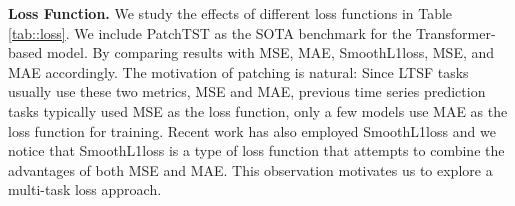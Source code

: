 \documentclass{article} \usepackage{iclr2024_conference,times}
\begin{document}
\textbf{Loss Function.} We study the effects of different loss functions in Table \ref{tab::loss}. We include PatchTST as the SOTA benchmark for the Transformer-based model. By comparing results with MSE, MAE, SmoothL1loss, MSE, and MAE accordingly. The motivation of patching is natural: Since LTSF tasks usually use these two metrics, MSE and MAE, previous time series prediction tasks typically used MSE as the loss function, only a few models \citep{scinet} use MAE as the loss function for training. Recent work has also employed SmoothL1loss \citep{petformer} and we notice that SmoothL1loss is a type of loss function that attempts to combine the advantages of both MSE and MAE. This observation motivates us to explore a multi-task loss approach. 

\linespread{1.1}
\begin{table*}[!htbp]
	\centering
\end{table*}
\end{document}
